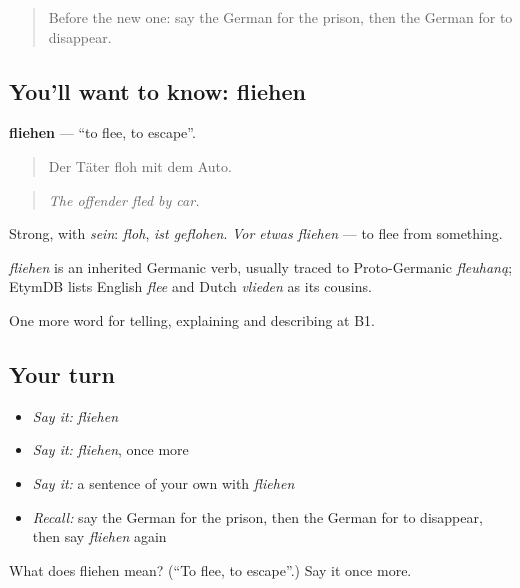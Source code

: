 \label{lesson:GE-C287-fliehen}



\begin{quote}
Before the new one: say the German for the prison, then the German for to disappear.
\end{quote}

\subsection*{You'll want to know: fliehen}
\textbf{fliehen} — \textquotedblleft{}to flee, to escape\textquotedblright{}.

\begin{quote}
Der Täter floh mit dem Auto.
\end{quote}

\begin{quote}
\emph{The offender fled by car.}
\end{quote}

Strong, with \emph{sein}: \emph{floh}, \emph{ist geflohen}. \emph{Vor etwas fliehen} — to flee from something.

\begin{cousinweb}
\emph{fliehen} is an inherited Germanic verb, usually traced to Proto-Germanic \emph{fleuhaną}; EtymDB lists English \emph{flee} and Dutch \emph{vlieden} as its cousins.
\end{cousinweb}

\begin{grammarlens}[title={What you've built}]
One more word for telling, explaining and describing at B1.
\end{grammarlens}

\subsection*{Your turn}
\begin{itemize}
\raggedright
  \item \emph{Say it:} \emph{fliehen}
  \item \emph{Say it:} \emph{fliehen}, once more
  \item \emph{Say it:} a sentence of your own with \emph{fliehen}
  \item \emph{Recall:} say the German for the prison, then the German for to disappear, then say \emph{fliehen} again
\end{itemize}

\begin{tcolorbox}[breakable,colback=teal!4,colframe=teal!35!black,title={Before you move on}]
What does fliehen mean? (\textquotedblleft{}To flee, to escape\textquotedblright{}.) Say it once more.
\end{tcolorbox}
